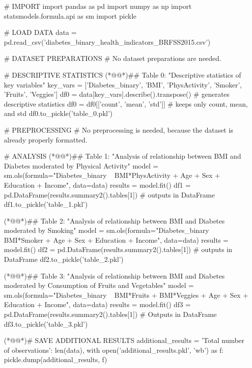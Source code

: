 \documentclass[11pt]{article}
\begin{document}
\begin{python}

# IMPORT
import pandas as pd
import numpy as np
import statsmodels.formula.api as sm
import pickle

# LOAD DATA
data = pd.read_csv('diabetes_binary_health_indicators_BRFSS2015.csv')

# DATASET PREPARATIONS
# No dataset preparations are needed.

# DESCRIPTIVE STATISTICS
(*@@*)## Table 0: "Descriptive statistics of key variables"
key_vars = ['Diabetes_binary', 'BMI', 'PhysActivity', 'Smoker', 'Fruits', 'Veggies']
df0 = data[key_vars].describe().transpose()  # generates descriptive statistics
df0 = df0[['count', 'mean', 'std']]  # keeps only count, mean, and std
df0.to_pickle('table_0.pkl')

# PREPROCESSING 
# No preprocessing is needed, because the dataset is already properly formatted.

# ANALYSIS
(*@@*)## Table 1: "Analysis of relationship between BMI and Diabetes moderated by Physical Activity"
model = sm.ols(formula="Diabetes_binary ~ BMI*PhysActivity + Age + Sex + Education + Income", data=data)
results = model.fit()
df1 = pd.DataFrame(results.summary2().tables[1])  # outputs in DataFrame
df1.to_pickle('table_1.pkl')

(*@@*)## Table 2: "Analysis of relationship between BMI and Diabetes moderated by Smoking"
model = sm.ols(formula="Diabetes_binary ~ BMI*Smoker + Age + Sex + Education + Income", data=data)
results = model.fit()
df2 = pd.DataFrame(results.summary2().tables[1])  # outputs in DataFrame
df2.to_pickle('table_2.pkl')

(*@@*)## Table 3: "Analysis of relationship between BMI and Diabetes moderated by Consumption of Fruits and Vegetables"
model = sm.ols(formula="Diabetes_binary ~ BMI*Fruits + BMI*Veggies + Age + Sex + Education + Income", data=data)
results = model.fit()
df3 = pd.DataFrame(results.summary2().tables[1])  # Outputs in DataFrame
df3.to_pickle('table_3.pkl')

(*@@*)# SAVE ADDITIONAL RESULTS
additional_results = {
    'Total number of observations': len(data),         
}
with open('additional_results.pkl', 'wb') as f:
    pickle.dump(additional_results, f)

\end{python}
\end{document}
